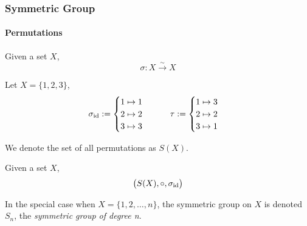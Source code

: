 \subsubsection{Symmetric Group}
\paragraph{Permutations}
\begin{definition}[Permutation]\label{def:permutation}
   Given a set \(X\),
   \[\sigma: X \xrightarrow{\sim} X\]
\end{definition}
\begin{example}
   Let \(X = \{1, 2, 3\}\),
   \[\sigma_{\operatorname{id}} := \begin{cases}1 \mapsto 1\\ 2 \mapsto 2 \\ 3 \mapsto 3 \end{cases} \qquad \tau := \begin{cases}1 \mapsto 3\\ 2 \mapsto 2 \\ 3 \mapsto 1 \end{cases}\]
\end{example}
\begin{remark}[Notation]
   We denote the set of all permutations as \(S(X)\).
\end{remark}

\begin{definition}
   Given a set \(X\),
   \[\big(S(X), \circ, \sigma_{\operatorname{id}}\big)\]
\end{definition}

In the special case when \(X = \{1, 2, \ldots, n\}\), the symmetric group on \(X\) is denoted \(S_n\), the \emph{symmetric group of degree n}.

